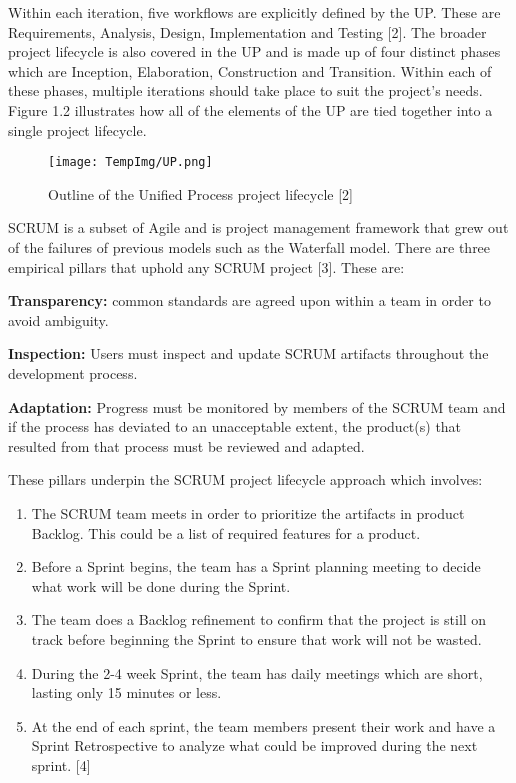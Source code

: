 \documentclass[fontsize=11pt]{extarticle}
\numberwithin{figure}{section} %
\numberwithin{table}{section}%
\begin{document}
Within each iteration, five workflows are explicitly defined by the UP.
These are Requirements, Analysis, Design, Implementation and Testing
{[}2{]}. The broader project lifecycle is also covered in the UP and is
made up of four distinct phases which are Inception, Elaboration,
Construction and Transition. Within each of these phases, multiple
iterations should take place to suit the project's needs. Figure 1.2
illustrates how all of the elements of the UP are tied together into a
single project lifecycle.

\begin{figure}[H]
      \centering
      \texttt{[image: TempImg/UP.png]}
      \caption{Outline of the Unified Process project lifecycle [2]}
 \end{figure}

SCRUM is a subset of Agile and is project management framework that grew
out of the failures of previous models such as the Waterfall model.
There are three empirical pillars that uphold any SCRUM project {[}3{]}.
These are:

\textbf{Transparency:} common standards are agreed upon within a team in
order to avoid ambiguity.

\textbf{Inspection:} Users must inspect and update SCRUM artifacts
throughout the development process.

\textbf{Adaptation:} Progress must be monitored by members of the SCRUM
team and if the process has deviated to an unacceptable extent, the
product(s) that resulted from that process must be reviewed and adapted.

These pillars underpin the SCRUM project lifecycle approach which
involves:

\begin{enumerate}
  \item The SCRUM team meets in order to prioritize the artifacts in product Backlog. This could be a list of required features for a product.
  \item Before a Sprint begins, the team has a Sprint planning meeting to decide what work will be done during the Sprint.
  \item  The team does a Backlog refinement to confirm that the project is still on track before beginning the Sprint to ensure that work will not be wasted.
  \item  During the 2-4 week Sprint, the team has daily meetings which are short, lasting only 15 minutes or less. 
  \item At the end of each sprint, the team members present their work and have a Sprint Retrospective to analyze what could be improved during the next sprint. [4]
\end{enumerate}
\end{document}
